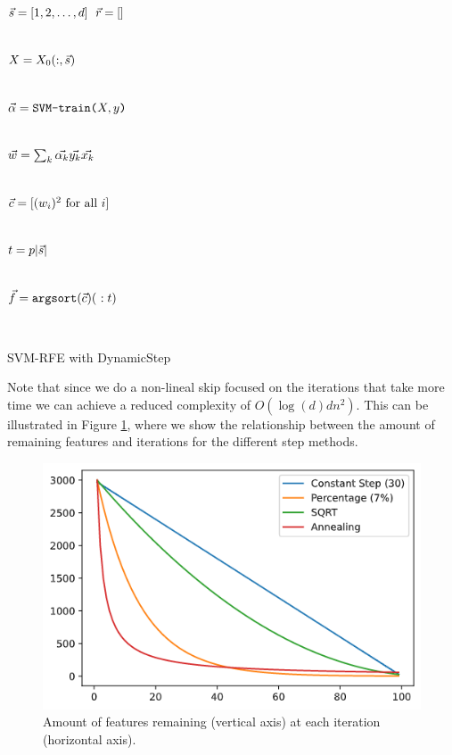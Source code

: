 \begin{algorithm}[h]
    \DontPrintSemicolon
      $\vec{s} = [1,2, \dotsc, d]$ 
      $\vec{r} = []$  
        {
            \\
            $X=X_0(:,\vec{s})$\VS

            \\
            $\vec{\alpha} = \texttt{SVM-train(} X, y \texttt{)}$\VS

            \\
            $\vec{w} = \sum_k{\vec{\alpha_k} \vec{y_k} \vec{x_k}}$\VS

            \\
            $\vec{c} = [(w_i)^2 \text{ for all $i$}]$\VS

            \\
            $t = p|\vec{s}|$\VS

            \\
            $\vt{f} = \texttt{argsort}(\vt{c})(\ :t)$\VS

            \\
        }
    \caption{SVM-RFE with DynamicStep}
\end{algorithm}
\VS
Note that since we do a non-lineal skip focused on the iterations that take more time we can achieve a reduced complexity of $O(\log(d)dn^2)$. This can be illustrated in Figure \ref{fig:ch5.dstep.comparetime}, where we show the relationship between the amount of remaining features and iterations for the different step methods. 

\begin{figure}[h]
    \centering
    \includegraphics[width=0.4\linewidth]{img/ch5/comparetimes.png}
    \caption{Amount of features remaining (vertical axis) at each iteration (horizontal axis).}
    \label{fig:ch5.dstep.comparetime}
\end{figure}

